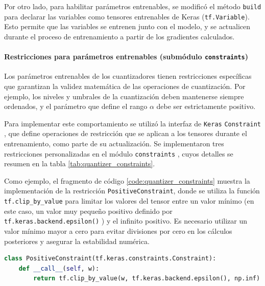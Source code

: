Por otro lado, para habilitar parámetros entrenables, se modificó el método \texttt{build} para declarar las variables como tensores entrenables de Keras (\texttt{tf.Variable}). Esto permite que las variables se entrenen junto con el modelo, y se actualicen durante el proceso de entrenamiento a partir de los gradientes calculados.

\paragraph{Restricciones para parámetros entrenables (submódulo \texttt{constraints})}
Los parámetros entrenables de los cuantizadores tienen restricciones específicas que garantizan la validez matemática de las operaciones de cuantización. Por ejemplo, los niveles y umbrales de la cuantización deben mantenerse siempre ordenados, y el parámetro que define el rango $\alpha$ debe ser estrictamente positivo.

Para implementar este comportamiento se utilizó la interfaz de \texttt{Keras} \texttt{Constraint} \cite{tensorflow_keras_constraint}, que define operaciones de restricción que se aplican a los tensores durante el entrenamiento, como parte de su actualización. Se implementaron tres restricciones personalizadas en el módulo \texttt{constraints} \cite{qtensor_constraints}, cuyos detalles se resumen en la tabla \ref{tab:quantizer_constraints}.



Como ejemplo, el fragmento de código \ref{code:quantizer_constraints} muestra la implementación de la restricción \texttt{PositiveConstraint}, donde se utiliza la función \texttt{tf.clip\_by\_value} \cite{tensorflow_clip_by_value} para limitar los valores del tensor entre un valor mínimo (en este caso, un valor muy pequeño positivo definido por \texttt{tf.keras.backend.epsilon()} \cite{tensorflow_epsilon_api}) y el infinito positivo. Es necesario utilizar un valor mínimo mayor a cero para evitar divisiones por cero en los cálculos posteriores y asegurar la estabilidad numérica.

\vspace{0.2cm}
\begin{lstlisting}[language=Python,label=code:quantizer_constraints,caption=Definición de restricciones para parámetros entrenables.]
  class PositiveConstraint(tf.keras.constraints.Constraint):
    def __call__(self, w):
        return tf.clip_by_value(w, tf.keras.backend.epsilon(), np.inf)
\end{lstlisting}
\vspace{-0.3cm}

